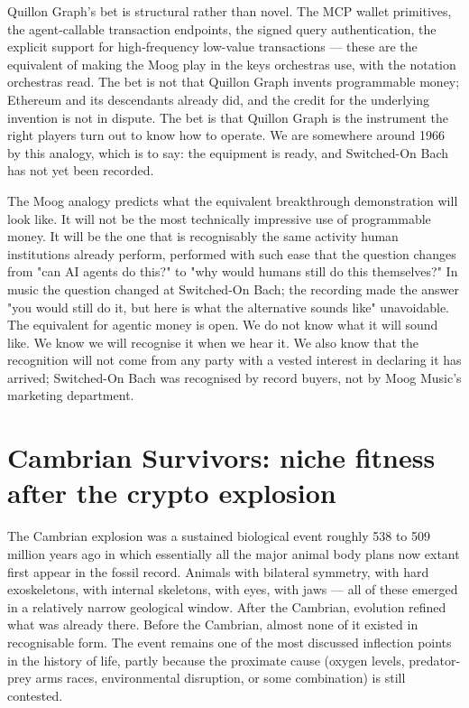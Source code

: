 \documentclass[11pt,a4paper]{article}
\begin{document}
Quillon Graph's bet is structural rather than novel. The MCP wallet
primitives, the agent-callable transaction endpoints, the signed query
authentication, the explicit support for high-frequency low-value
transactions --- these are the equivalent of making the Moog play in the
keys orchestras use, with the notation orchestras read. The bet is not
that Quillon Graph invents programmable money; Ethereum and its
descendants already did, and the credit for the underlying invention is
not in dispute. The bet is that Quillon Graph is the instrument the
right players turn out to know how to operate. We are somewhere around
1966 by this analogy, which is to say: the equipment is ready, and
Switched-On Bach has not yet been recorded.

The Moog analogy predicts what the equivalent breakthrough demonstration
will look like. It will not be the most technically impressive use of
programmable money. It will be the one that is recognisably the same
activity human institutions already perform, performed with such ease
that the question changes from "can AI agents do this?" to "why would
humans still do this themselves?" In music the question changed at
Switched-On Bach; the recording made the answer "you would still do it,
but here is what the alternative sounds like" unavoidable. The
equivalent for agentic money is open. We do not know what it will sound
like. We know we will recognise it when we hear it. We also know that
the recognition will not come from any party with a vested interest in
declaring it has arrived; Switched-On Bach was recognised by record
buyers, not by Moog Music's marketing department.

\section{Cambrian Survivors: niche fitness after the crypto explosion}\label{sec:cambrian}

The Cambrian explosion was a sustained biological event roughly 538 to
509 million years ago in which essentially all the major animal body
plans now extant first appear in the fossil record. Animals with
bilateral symmetry, with hard exoskeletons, with internal skeletons,
with eyes, with jaws --- all of these emerged in a relatively narrow
geological window. After the Cambrian, evolution refined what was
already there. Before the Cambrian, almost none of it existed in
recognisable form. The event remains one of the most discussed
inflection points in the history of life, partly because the proximate
cause (oxygen levels, predator-prey arms races, environmental
disruption, or some combination) is still contested.
\end{document}
